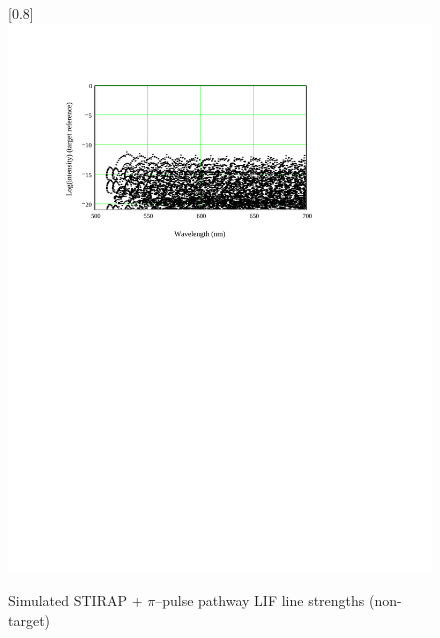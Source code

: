 \begin{figure}
\scalebox{0.8}[0.8]{
\includegraphics[bb=0 480 489 752]
{STIRAP_77/STIRAP_77.pdf}
}
\caption[Simulated STIRAP + $\pi$--pulse pathway LIF line strengths (non-target)]{Simulated STIRAP + $\pi$--pulse pathway LIF line strengths (non-target)}
\label{STIRAP_77}
\end{figure}
